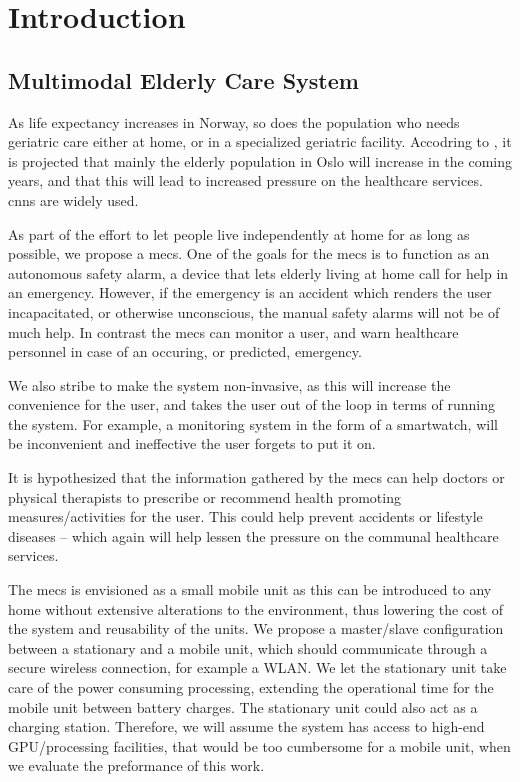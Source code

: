 \chapter{Introduction}

\section{Multimodal Elderly Care System}
As life expectancy increases in Norway, so does the population who needs geriatric care
either at home, or in a specialized geriatric facility. Accodring to \cite{oslohelsa}, it
is projected that mainly the elderly population in Oslo will increase in the coming years,
and that this will lead to increased pressure on the healthcare services. \gls{cnn}s are
widely used.

As part of the effort to let people live independently at home for as long as possible, we propose a \gls{mecs}. One of the goals for the \gls{mecs} is to function as an autonomous safety alarm, a device that lets elderly living at home call for help in an emergency. However, if the emergency is an accident which renders the user incapacitated, or otherwise unconscious, the manual safety alarms will not be of much help. In contrast the \gls{mecs} can monitor a user, and warn healthcare personnel in case of an occuring, or predicted, emergency.

We also stribe to make the system non-invasive, as this will increase the convenience for the user, and takes the user out of the loop in terms of running the system. For example, a monitoring system in the form of a smartwatch, will be inconvenient and ineffective the user forgets to put it on.

It is hypothesized that the information gathered by the \gls{mecs} can help doctors or physical therapists to prescribe or recommend health promoting measures/activities for the user. This could help prevent accidents or lifestyle diseases -- which again will help lessen the pressure on the communal healthcare services.

The \gls{mecs} is envisioned as a small mobile unit as this can be introduced to any home without extensive alterations to the environment, thus lowering the cost of the system and reusability of the units. We propose a master/slave configuration between a stationary and a mobile unit, which should communicate through a secure wireless connection, for example a WLAN. We let the stationary unit take care of the power consuming processing, extending the operational time for the mobile unit between battery charges. The stationary unit could also act as a charging station. Therefore, we will assume the system has access to high-end GPU/processing facilities, that would be too cumbersome for a mobile unit, when we evaluate the preformance of this work.

